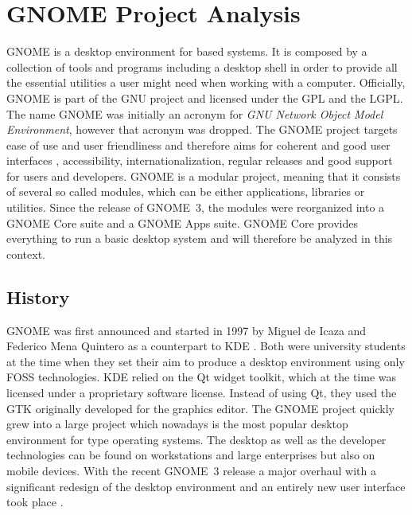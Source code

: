 \section{GNOME Project Analysis} %


\noindent GNOME is a desktop environment for  based systems.
It is composed by a collection of tools and programs including a desktop shell
in order to provide all the essential utilities a user might need when working
with a computer. Officially, GNOME is part of the \ac{GNU} project and licensed
under the \ac{GPL} and the \ac{LGPL}. The name GNOME was initially an acronym
for \emph{GNU Network Object Model Environment}, however that acronym was
dropped. The GNOME project targets ease of use and user friendliness and
therefore aims for coherent and good user interfaces \cite{GNOMEHIG},
accessibility, internationalization, regular releases and good support for
users and developers. GNOME is a modular project, meaning that it consists of
several so called modules, which can be either applications, libraries or
utilities. Since the release of GNOME~3, the modules were reorganized into a
GNOME Core suite and a GNOME Apps suite. GNOME Core provides everything to run
a basic desktop system and will therefore be analyzed in this context.

\subsection{History} %

GNOME was first announced and started in 1997 by Miguel de Icaza and Federico
Mena Quintero as a counterpart to KDE
\cite{German2003,GNOMEAbout,GNOMEAnnouncement}. Both were university students
at the time when they set their aim to produce a desktop environment using only
\ac{FOSS} technologies. KDE relied on the Qt widget toolkit, which at the time
was licensed under a proprietary software license. Instead of using Qt, they
used the \ac{GTK} originally developed for the  graphics
editor. The GNOME project quickly grew into a large project which nowadays is
the most popular desktop environment for  type operating
systems. The desktop as well as the developer technologies can be found on
workstations and large enterprises but also on mobile devices. With the recent
GNOME~3 release a major overhaul with a significant redesign of the desktop
environment and an entirely new user interface took place \cite{GNOMEPress}.

